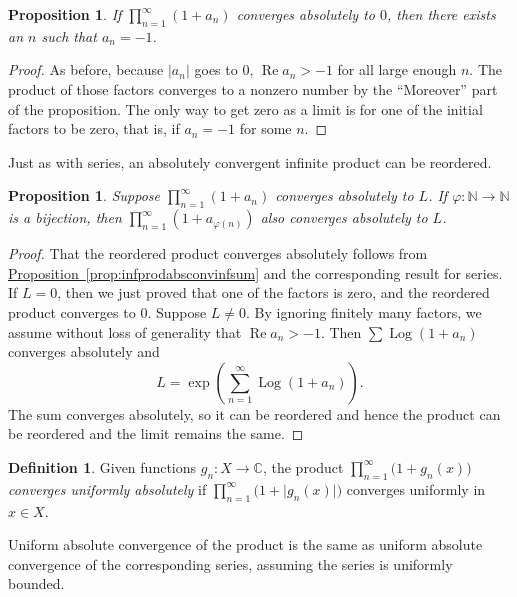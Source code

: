 \documentclass[12pt,openany]{book}
\renewcommand{\Re}{\operatorname{Re}}
\newcommand{\Log}{\operatorname{Log}}
\newcommand{\sabs}[1]{\lvert {#1} \rvert}
\newcommand{\C}{{\mathbb{C}}}
\newcommand{\N}{{\mathbb{N}}}
\newcommand{\myquote}[1]{``#1''}
\theoremstyle{plain}
\newtheorem{prop}[thm]{Proposition}
\theoremstyle{remark}
\theoremstyle{definition}
\newtheorem{defn}[thm]{Definition}
\theoremstyle{exercise}
\theoremstyle{example}
\newcommand{\propref}[1]{\hyperref[#1]{Proposition~\ref*{#1}}}
\begin{document}
\begin{prop}
If $\prod_{n=1}^\infty (1+a_n)$ converges absolutely to $0$, then there
exists an $n$ such that $a_n=-1$.
\end{prop}

\begin{proof}
As before, because $\sabs{a_n}$ goes to $0$,
$\Re a_n > -1$ for all large enough $n$.  The product
of those factors converges to a nonzero number by the \myquote{Moreover} part of the
proposition.  The only way to get zero as a limit is for one of the initial
factors to be zero, that is, if $a_n=-1$ for some $n$.
\end{proof}

Just as with series,
an absolutely convergent infinite product can be reordered.

\begin{prop}
Suppose $\prod_{n=1}^\infty (1+a_n)$ converges absolutely to $L$.
If $\varphi \colon \N \to \N$ is a bijection, then 
$\prod_{n=1}^\infty (1+a_{\varphi(n)})$ also converges absolutely to $L$.
\end{prop}

\begin{proof}
That the reordered product converges absolutely follows from 
\propref{prop:infprodabsconvinfsum} and the corresponding result for series.
If $L=0$, then we just proved that one of the factors is zero,
and the reordered product converges to $0$.
Suppose $L \neq 0$.
By ignoring finitely many factors, we assume without loss of generality
that $\Re a_n > -1$.  Then $\sum \Log(1+a_n)$ converges absolutely and
\begin{equation*}
L = \exp\left(\sum_{n=1}^\infty \Log(1+a_n)\right) .
\end{equation*}
The sum converges absolutely, so it can be reordered and hence the product
can be reordered and the limit remains the same.
\end{proof}

\begin{defn}
Given functions $g_n \colon X \to \C$, the product
$\prod_{n=1}^{\infty} \bigl(1+g_n(x)\bigr)$ 
\emph{converges uniformly absolutely}%
%
if
$\prod_{n=1}^{\infty} \bigl(1+\sabs{g_n(x)}\bigr)$ 
converges uniformly in $x \in X$.
\end{defn}

Uniform absolute convergence of the product is the same as uniform
absolute convergence of the corresponding series, assuming
the series is uniformly bounded.
\end{document}
